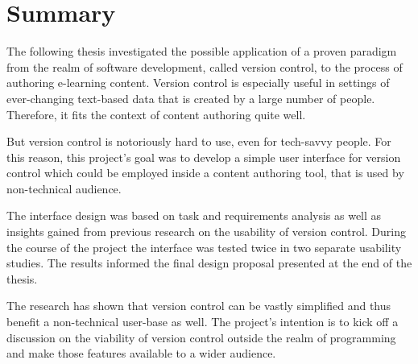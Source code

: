 \chapter{Summary}
\pagestyle{headings}

The following thesis investigated the possible application of a proven paradigm from the realm of software development, called version control, to the process of authoring e-learning content. Version control is especially useful in settings of ever-changing text-based data that is created by a large number of people. Therefore, it fits the context of content authoring quite well. 

But version control is notoriously hard to use, even for tech-savvy people. For this reason, this project's goal was to develop a simple user interface for version control which could be employed inside a content authoring tool, that is used by non-technical audience.

The interface design was based on task and requirements analysis as well as insights gained from previous research on the usability of version control. During the course of the project the interface was tested twice in two separate usability studies. The results informed the final design proposal presented at the end of the thesis.

The research has shown that version control can be vastly simplified and thus benefit a non-technical user-base as well. The project's intention is to kick off a discussion on the viability of version control outside the realm of programming and make those features available to a wider audience.




